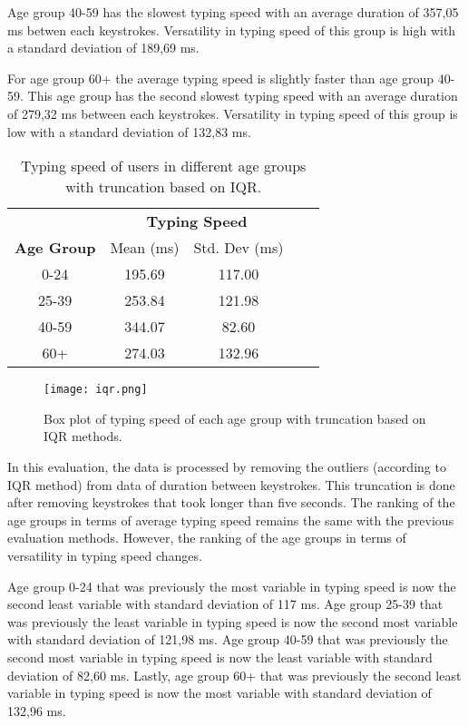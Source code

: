 Age group 40-59 has the slowest typing speed with an average duration of 357,05 ms betwen each keystrokes.
Versatility in typing speed of this group is high with a standard deviation of 189,69 ms.

For age group 60+ the average typing speed is slightly faster than age group 40-59.
This age group has the second slowest typing speed with an average duration of 279,32 ms between each keystrokes.
Versatility in typing speed of this group is low with a standard deviation of 132,83 ms.

\begin{table}[h]
    \centering
    \begin{tabular}{ccccc}
    \toprule
    \multicolumn{1}{c}{} & \multicolumn{2}{c}{\textbf{Typing Speed}}\\
    \cmidrule(rl){2-3} \cmidrule(rl){4-5}
    \textbf{Age Group} & {Mean (ms)} & {Std. Dev (ms)} \\
    \midrule
    0-24 & 195.69 & 117.00 \\
    25-39 & 253.84 & 121.98  \\
    40-59 & 344.07 & 82.60  \\
    60+ & 274.03 & 132.96 \\
    \bottomrule
    \end{tabular}
    \caption{Typing speed of users in different age groups with truncation based on \ac{IQR}.}
    \label{tab:typing_behavior_iqr}
\end{table}


\begin{figure}[h!]
    \centering
    \texttt{[image: iqr.png]}
    \caption{Box plot of typing speed of each age group with truncation based on \ac{IQR} methods.}
    \label{box_plot_typing_speed_iqr}
\end{figure}

In this evaluation, the data is processed by removing the outliers (according to \ac{IQR} method) from data of duration between keystrokes.
This truncation is done after removing keystrokes that took longer than five seconds.
The ranking of the age groups in terms of average typing speed remains the same with the previous evaluation methods.
However, the ranking of the age groups in terms of versatility in typing speed changes.

Age group 0-24 that was previously the most variable in typing speed is now the second least variable with standard deviation of 117 ms.
Age group 25-39 that was previously the least variable in typing speed is now the second most variable with standard deviation of 121,98 ms.
Age group 40-59 that was previously the second most variable in typing speed is now the least variable with standard deviation of 82,60 ms.
Lastly, age group 60+ that was previously the second least variable in typing speed is now the most variable with standard deviation of 132,96 ms. 

